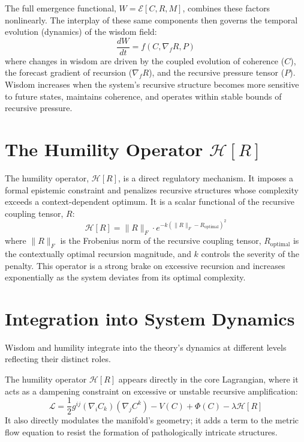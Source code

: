 The full emergence functional, \(W = \mathcal{E}[C, R, M]\), combines these factors nonlinearly. The interplay of these same components then governs the temporal evolution (dynamics) of the wisdom field:
\begin{equation}
\frac{dW}{dt} = f(C, \nabla_f R, P)
\end{equation}
where changes in wisdom are driven by the coupled evolution of coherence (\(C\)), the forecast gradient of recursion (\(\nabla_f R\)), and the recursive pressure tensor (\(P\)). Wisdom increases when the system's recursive structure becomes more sensitive to future states, maintains coherence, and operates within stable bounds of recursive pressure.

\section{The Humility Operator \(\mathcal{H}[R]\)}

The humility operator, \(\mathcal{H}[R]\), is a direct regulatory mechanism. It imposes a formal epistemic constraint and penalizes recursive structures whose complexity exceeds a context-dependent optimum. It is a scalar functional of the recursive coupling tensor, \(R\):
\begin{equation}
\mathcal{H}[R] = \|R\|_F \cdot e^{-k(\|R\|_F - R_{\text{optimal}})^2}
\end{equation}
where \(\|R\|_F\) is the Frobenius norm of the recursive coupling tensor, \(R_{\text{optimal}}\) is the contextually optimal recursion magnitude, and \(k\) controls the severity of the penalty. This operator is a strong brake on excessive recursion and increases exponentially as the system deviates from its optimal complexity.

\section{Integration into System Dynamics}

Wisdom and humility integrate into the theory's dynamics at different levels reflecting their distinct roles.

The humility operator \(\mathcal{H}[R]\) appears directly in the core Lagrangian, where it acts as a dampening constraint on excessive or unstable recursive amplification:
\begin{equation}
\mathcal{L} = \frac{1}{2} g^{ij} (\nabla_i C_k)(\nabla_j C^k) - V(C) + \Phi(C) - \lambda \mathcal{H}[R]
\end{equation}
It also directly modulates the manifold's geometry; it adds a term to the metric flow equation to resist the formation of pathologically intricate structures.

